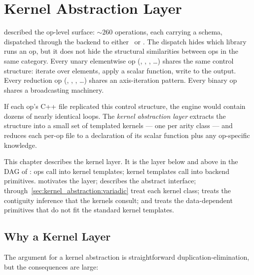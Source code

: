\chapter{Kernel Abstraction Layer}
\label{ch:kernel_abstraction}

 described the op-level surface: \(\sim 260\)
operations, each carrying a schema, dispatched through the backend
to either \MLX\ or \Accelerate. The dispatch hides which library
runs an op, but it does not hide the structural similarities
between ops in the same category. Every unary elementwise op
(, , , \ldots) shares the same
control structure: iterate over elements, apply a scalar function,
write to the output. Every reduction op (, ,
, \ldots) shares an axis-iteration pattern. Every binary
op shares a broadcasting machinery.

If each op's C++ file replicated this control structure, the engine
would contain dozens of nearly identical loops. The \emph{kernel
abstraction layer} extracts the structure into a small set of
templated kernels --- one per arity class --- and reduces each
per-op file to a declaration of its scalar function plus any
op-specific knowledge.

This chapter describes the kernel layer. It is the layer below
 and above  in the DAG of
: ops call into kernel templates; kernel
templates call into backend primitives. 
motivates the layer; 
describes the abstract interface;
through~\ref{sec:kernel_abstraction:variadic} treat each kernel
class;  treats the
contiguity inference that the kernels consult; and
 treats the
data-dependent primitives that do not fit the standard kernel
templates.

\section{Why a Kernel Layer}
\label{sec:kernel_abstraction:why}

The argument for a kernel abstraction is straightforward
duplication-elimination, but the consequences are large:

